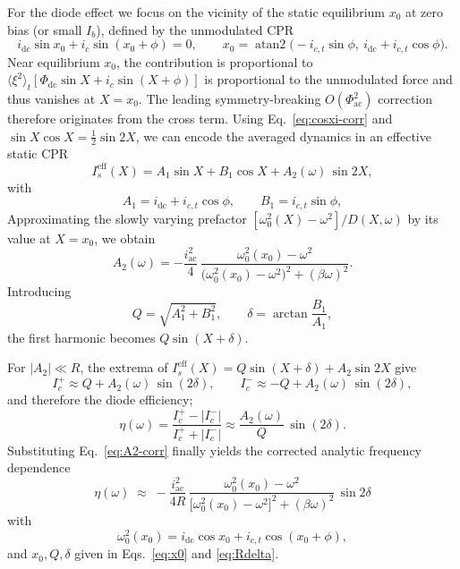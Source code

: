\documentclass[prl,twocolumn,superscriptaddress,showpacs,nofootinbib]{revtex4-2}
\begin{document}
For the diode effect we focus on the vicinity of the static equilibrium
$x_0$ at zero bias (or small $I_b$), defined by the unmodulated CPR
\begin{equation}
i_{\mathrm{dc}}\sin x_0+i_c\sin(x_0+\phi)=0,
\qquad
x_0=\operatorname{atan2}\!\big(-i_{c,t}\sin\phi,\ i_{\mathrm{dc}}+i_{c,t}\cos\phi\big).
\label{eq:x0}
\end{equation}
Near equilibrium $x_0$, the contribution is proportional to
$\langle\xi^2\rangle_t[\Phi_{\mathrm{dc}}\sin X+i_c\sin(X+\phi)]$
is proportional to the unmodulated force and thus vanishes at $X=x_0$.
The leading symmetry-breaking $O(\Phi_{\mathrm{ac}}^2)$ correction therefore originates from the cross term. Using Eq.~\eqref{eq:cosxi-corr} and $\sin X\cos X=\tfrac12\sin2X$,
we can encode the averaged dynamics in an effective static CPR
\begin{equation}
I_s^{\mathrm{eff}}(X)=A_1\sin X+B_1\cos X + A_2(\omega)\,\sin 2X,
\label{eq:CPR-eff}
\end{equation}
with
\begin{equation}
A_1=i_{\mathrm{dc}}+i_{c,t}\cos\phi,\qquad B_1=i_{c,t}\sin\phi,
\label{eq:A1B1}
\end{equation}
Approximating the slowly varying prefactor
$[\omega_0^2(X)-\omega^2]/D(X,\omega)$ by its value at $X=x_0$, we obtain
\begin{equation}
A_2(\omega)=
-\frac{i_{\mathrm{ac}}^2}{4}\,
\frac{\omega_0^2(x_0)-\omega^2}{\big(\omega_0^2(x_0)-\omega^2\big)^2+(\beta\omega)^2}.
\label{eq:A2-corr}
\end{equation}
Introducing
\begin{equation}
Q=\sqrt{A_1^2+B_1^2},\qquad \delta = \arctan\!\frac{B_1}{A_1},
\label{eq:Rdelta}
\end{equation}
the first harmonic becomes $Q\sin(X+\delta)$.


For $|A_2|\ll R$, the extrema of
$I_s^{\mathrm{eff}}(X)=Q\sin(X+\delta)+A_2\sin2X$ give
\begin{equation}
I_c^+ \approx Q + A_2(\omega)\,\sin(2\delta),
\qquad
I_c^- \approx -Q + A_2(\omega)\,\sin(2\delta),
\label{eq:Icpm-corr}
\end{equation}
and therefore the diode efficiency;
\begin{equation}
\eta(\omega)=\frac{I_c^+-|I_c^-|}{I_c^+ + |I_c^-|}
\approx
\frac{A_2(\omega)}{Q}\,\sin(2\delta).
\label{eq:eta-gen-corr}
\end{equation}
Substituting Eq.~\eqref{eq:A2-corr} finally yields the corrected analytic
frequency dependence
\begin{equation}
\eta(\omega)
\;\approx\;
-\frac{i_{\mathrm{ac}}^2}{4R}\,
\frac{\omega_0^2(x_0)-\omega^2}
     {\big[\omega_0^2(x_0)-\omega^2\big]^2+(\beta\omega)^2}
\,\sin 2\delta
\label{eq:eta-final-correct}
\end{equation}
with
\begin{equation}
\omega_0^2(x_0)=i_{\mathrm{dc}}\cos x_0 + i_{c,t}\cos(x_0+\phi),
\end{equation}
and $x_0,Q,\delta$ given in Eqs.~\eqref{eq:x0} and \eqref{eq:Rdelta}.
\end{document}
